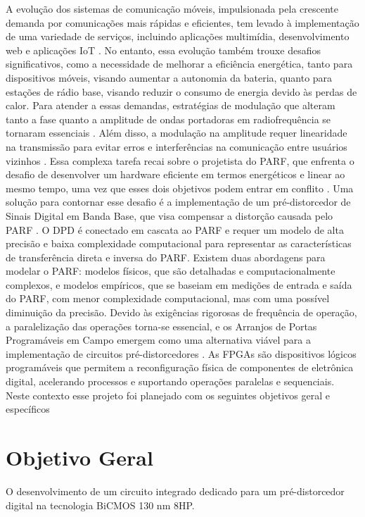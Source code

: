 A evolução dos sistemas de comunicação móveis, impulsionada pela crescente demanda por
comunicações mais rápidas e eficientes, tem levado à implementação de uma variedade de serviços,
incluindo aplicações multimídia, desenvolvimento web e aplicações IoT \cite{John2016}. No entanto, essa
evolução também trouxe desafios significativos, como a necessidade de melhorar a eficiência
energética, tanto para dispositivos móveis, visando aumentar a autonomia da bateria, quanto para
estações de rádio base, visando reduzir o consumo de energia devido às perdas de calor.
Para atender a essas demandas, estratégias de modulação que alteram tanto a fase quanto a
amplitude de ondas portadoras em radiofrequência se tornaram essenciais \cite{Kenington2000}. Além disso, a
modulação na amplitude requer linearidade na transmissão para evitar erros e interferências na
comunicação entre usuários vizinhos \cite{Cripps2006}. Essa complexa tarefa recai sobre o projetista do
PARF, que enfrenta o desafio de desenvolver um
hardware eficiente em termos energéticos e linear ao mesmo tempo, uma vez que esses dois objetivos
podem entrar em conflito \cite{Chavez2018}.
Uma solução para contornar esse desafio é a implementação de um pré-distorcedor de Sinais
Digital em Banda Base, que visa compensar a distorção causada pelo PARF \cite{Cripps2006}. O DPD é conectado em cascata ao PARF e requer um modelo de alta precisão e baixa complexidade computacional para representar as características de transferência direta e inversa do PARF. Existem duas abordagens para modelar o PARF: modelos físicos, que são detalhadas e computacionalmente complexos, e modelos empíricos, que se baseiam em medições de entrada e saída do PARF, com menor complexidade computacional, mas com uma possível diminuição da precisão.
Devido às exigências rigorosas de frequência de operação, a paralelização das operações
torna-se essencial, e os Arranjos de Portas Programáveis em Campo emergem como uma
alternativa viável para a implementação de circuitos pré-distorcedores \cite{Pedroni2010}. As FPGAs são dispositivos
lógicos programáveis que permitem a reconfiguração física de componentes de eletrônica digital,
acelerando processos e suportando operações paralelas e sequenciais. Neste contexto esse projeto foi planejado com os seguintes objetivos geral e específicos

\section{Objetivo Geral}
O desenvolvimento de um circuito integrado dedicado para um pré-distorcedor digital na tecnologia BiCMOS 130 nm 8HP.
